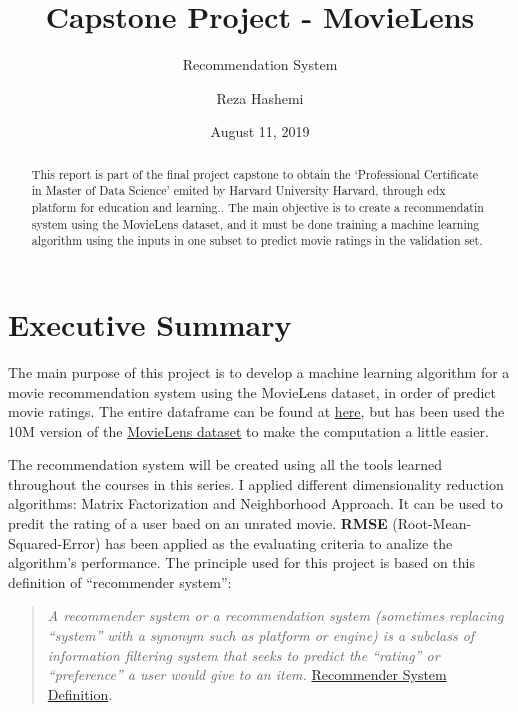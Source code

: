 \documentclass[]{article}
\title{Capstone Project - MovieLens}
\subtitle{Recommendation System}
\author{Reza Hashemi}
\date{August 11, 2019}
\begin{document}
\maketitle
\begin{abstract}
This report is part of the final project capstone to obtain the
`Professional Certificate in Master of Data Science' emited by Harvard
University Harvard, through edx platform for education and learning..
The main objective is to create a recommendatin system using the
MovieLens dataset, and it must be done training a machine learning
algorithm using the inputs in one subset to predict movie ratings in the
validation set.
\end{abstract}

{
\setcounter{tocdepth}{3}
\tableofcontents
}
\pagebreak

\hypertarget{executive-summary}{%
\section{Executive Summary}\label{executive-summary}}

The main purpose of this project is to develop a machine learning
algorithm for a movie recommendation system using the MovieLens dataset,
in order of predict movie ratings. The entire dataframe can be found at
\href{https://grouplens.org/datasets/movielens/latest/}{here}, but has
been used the 10M version of the
\href{http://grouplens.org/datasets/movielens/10m/}{MovieLens dataset}
to make the computation a little easier.

The recommendation system will be created using all the tools learned
throughout the courses in this series. I applied different
dimensionality reduction algorithms: Matrix Factorization and
Neighborhood Approach. It can be used to predit the rating of a user
baed on an unrated movie. \textbf{RMSE} (Root-Mean-Squared-Error) has
been applied as the evaluating criteria to analize the algorithm's
performance. The principle used for this project is based on this
definition of ``recommender system'':

\begin{quote}
\emph{A recommender system or a recommendation system (sometimes
replacing ``system'' with a synonym such as platform or engine) is a
subclass of information filtering system that seeks to predict the
``rating'' or ``preference'' a user would give to an item.}
\href{https://en.wikipedia.org/wiki/Recommender_system}{Recommender
System Definition}.
\end{quote}
\end{document}
